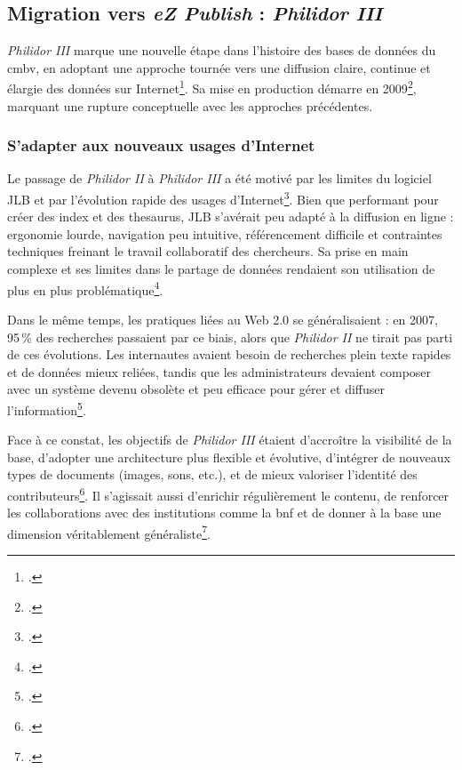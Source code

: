\subsection{Migration vers \textit{eZ Publish} : \textit{Philidor III}}

\textit{Philidor III} marque une nouvelle étape dans l'histoire des bases de données du \gls{cmbv}, en adoptant une approche tournée vers une diffusion claire, continue et élargie des données sur Internet\footcite[Présentation de la base de données PHILIDOR en Octobre 2010]{michelbenoitDocumentationTechniqueBibliographique1997}. Sa mise en production démarre en 2009\footcite[Rapport sur le projet Philidor de Jérémie Crublet, juin 2006]{michelbenoitDocumentationTechniqueBibliographique1997}, marquant une rupture conceptuelle avec les approches précédentes.

\subsubsection{S'adapter aux nouveaux usages d'Internet}

Le passage de \textit{Philidor II} à \textit{Philidor III} a été motivé par les limites du logiciel JLB et par l’évolution rapide des usages d’Internet\footcite[La base de données Philidor - Bilan et enjeux de la nouvelle version, Jérémie Crublet et Michel Benoît, novembre 2010]{michelbenoitDocumentationTechniqueBibliographique1997}. Bien que performant pour créer des index et des \gls{thesaurus}, JLB s’avérait peu adapté à la diffusion en ligne : ergonomie lourde, navigation peu intuitive, référencement difficile et contraintes techniques freinant le travail collaboratif des chercheurs. Sa prise en main complexe et ses limites dans le partage de données rendaient son utilisation de plus en plus problématique\footcite{michelbenoitDocumentationTechniqueBibliographique1997}.  

Dans le même temps, les pratiques liées au Web 2.0 se généralisaient : en 2007, 95\,\% des recherches passaient par ce biais, alors que \textit{Philidor II} ne tirait pas parti de ces évolutions. Les internautes avaient besoin de recherches plein texte rapides et de données mieux reliées, tandis que les administrateurs devaient composer avec un système devenu obsolète et peu efficace pour gérer et diffuser l’information\footcite{michelbenoitDocumentationTechniqueBibliographique1997}.  

Face à ce constat, les objectifs de \textit{Philidor III} étaient d’accroître la visibilité de la base, d’adopter une architecture plus flexible et évolutive, d’intégrer de nouveaux types de documents (images, sons, etc.), et de mieux valoriser l’identité des contributeurs\footcite{michelbenoitDocumentationTechniqueBibliographique1997}. Il s’agissait aussi d’enrichir régulièrement le contenu, de renforcer les collaborations avec des institutions comme la \gls{bnf} et de donner à la base une dimension véritablement généraliste\footcite{michelbenoitDocumentationTechniqueBibliographique1997}.  

